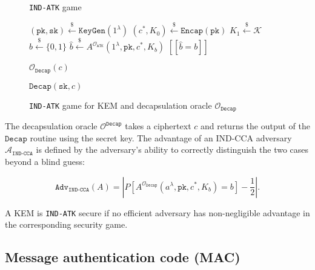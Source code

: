 \documentclass[runningheads]{llncs}
\newcommand{\keygen}{\texttt{KeyGen}}
\newcommand{\encap}{\texttt{Encap}}
\newcommand{\decap}{\texttt{Decap}}
\newcommand{\pk}{\texttt{pk}}
\newcommand{\sk}{\texttt{sk}}
\newcommand{\leftsample}{\stackrel{\$}{\leftarrow}}
\newcommand{\llbrack}{[\![}
\newcommand{\rrbrack}{]\!]}
\newcommand{\norm}[1]{\left\lvert #1 \right\rvert}
\newcommand{\adv}{\texttt{Adv}}
\begin{document}
\begin{figure}[H]
    \centering
    \begin{minipage}[t]{0.49\textwidth}
        \begin{algorithm}[H]
            \caption*{\texttt{IND-ATK} game}
            \begin{algorithmic}[1]
                \State $(\pk, \sk) \leftsample \keygen(1^\lambda)$
                \State $(c^\ast, K_0) \leftsample \encap(\pk)$
                \State $K_1 \leftsample \mathcal{K}$
                \State $b \leftsample \{0, 1\}$
                \State $\hat{b} \leftsample A^{\mathcal{O}_\texttt{ATK}}(
                    1^\lambda, \pk, c^\ast, K_b
                )$
                \State \Return $\llbrack \hat{b} = b \rrbrack$
            \end{algorithmic}
        \end{algorithm}
    \end{minipage}\hfill
    \begin{minipage}[t]{0.49\textwidth}
        \begin{algorithm}[H]
        \caption*{$\mathcal{O}_\decap(c)$}
        \begin{algorithmic}[1]
            \State \Return $\decap(\sk, c)$
        \end{algorithmic}
        \end{algorithm}
    \end{minipage}
    \caption{\texttt{IND-ATK} game for KEM and decapsulation oracle $\mathcal{O}_\decap$}\label{fig:kem-game}
\end{figure}

The decapsulation oracle $\mathcal{O}^\decap$ takes a ciphertext $c$ and returns the output of the $\decap$ routine using the secret key. The advantage of an IND-CCA adversary $\mathcal{A}_\texttt{IND-CCA}$ is defined by the adversary's ability to correctly distinguish the two cases beyond a blind guess:

\begin{equation*}
    \adv_\texttt{IND-CCA}(A) = \norm{
        P[A^{\mathcal{O}_\decap}(a^\lambda, \pk, c^\ast, K_b) = b] - \frac{1}{2}
    }.
\end{equation*}

A KEM is \texttt{IND-ATK} secure if no efficient adversary has non-negligible advantage in the corresponding security game.

\subsection{Message authentication code (MAC)}\label{sec:message-authentication-code}
\end{document}
